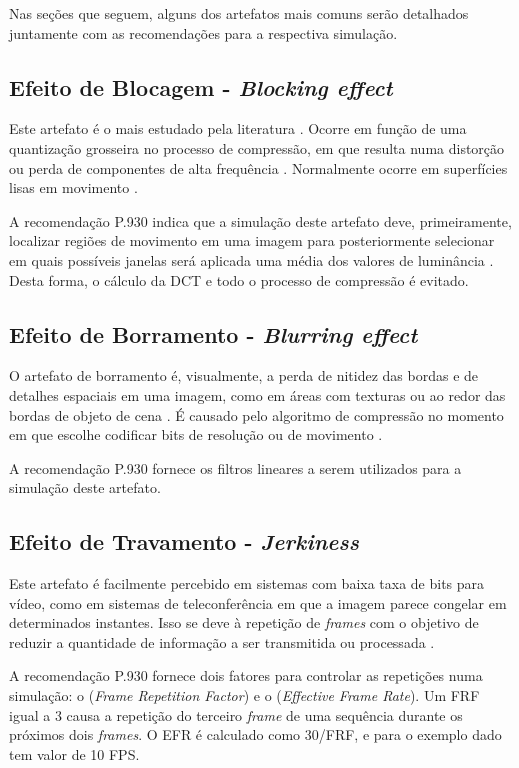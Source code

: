 Nas seções que seguem, alguns dos artefatos mais comuns serão detalhados juntamente com as recomendações para a respectiva simulação.

\subsection{Efeito de Blocagem - \emph{Blocking effect}}

Este artefato é o mais estudado pela literatura \cite{emmersonsilva}. Ocorre em função de uma quantização grosseira no processo de compressão, em que resulta numa distorção ou perda de componentes de alta frequência \cite{itup930}. Normalmente ocorre em superfícies lisas em movimento \cite{itup930} \cite{farias2007}.

A recomendação P.930 indica que a simulação deste artefato deve, primeiramente, localizar regiões de movimento em uma imagem para posteriormente selecionar em quais possíveis janelas será aplicada uma média dos valores de luminância \cite{itup930}. Desta forma, o cálculo da DCT e todo o processo de compressão é evitado.

\subsection{Efeito de Borramento - \emph{Blurring effect}}

O artefato de borramento é, visualmente, a perda de nitidez das bordas e de detalhes espaciais em uma imagem, como em áreas com texturas ou ao redor das bordas de objeto de cena \cite{wurao2005}. É causado pelo algoritmo de compressão no momento em que escolhe codificar bits de resolução ou de movimento \cite{itup930}.

A recomendação P.930 fornece os filtros lineares a serem utilizados para a simulação deste artefato.

\subsection{Efeito de Travamento - \emph{Jerkiness}}

Este artefato é facilmente percebido em sistemas com baixa taxa de bits para vídeo, como em sistemas de teleconferência \cite{itup930} em que a imagem parece congelar em determinados instantes. Isso se deve à repetição de \emph{frames} com o objetivo de reduzir a quantidade de informação a ser transmitida ou processada \cite{itup930}.

A recomendação P.930 fornece dois fatores para controlar as repetições numa simulação: o  (\emph{Frame Repetition Factor}) e o  (\emph{Effective Frame Rate}). Um FRF igual a 3 causa a repetição do terceiro \emph{frame} de uma sequência durante os próximos dois \emph{frames}. O EFR é calculado como 30/FRF, e para o exemplo dado tem valor de 10 FPS.

